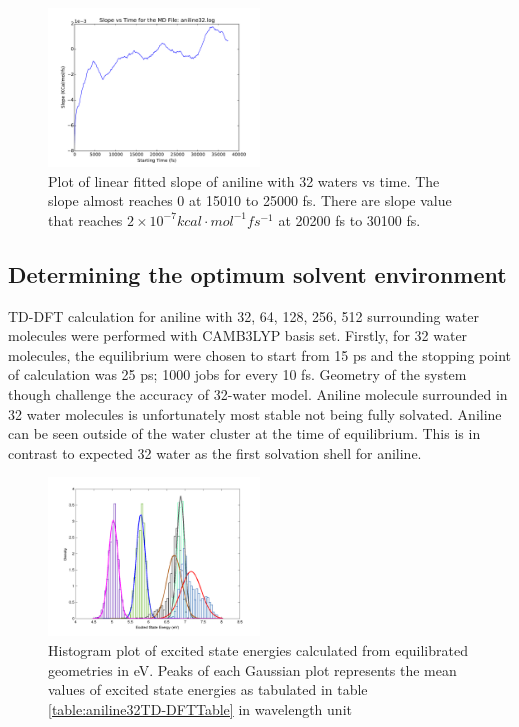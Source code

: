 \documentclass[
journal=jpcbfk, %
manuscript=article]{achemso}
\begin{document}
\begin{figure}[!htb]
	\centering		
	\includegraphics[width=0.5\textwidth]{CAMB3LYP/aniline32_log_SlopePlot.pdf}
	\caption{Plot of linear fitted slope of aniline with 32 waters vs time. The slope almost reaches 0 at 15010 to 25000 fs. There are slope value that reaches \(2\times 10^{-7} kcal\cdot mol^{-1}fs^{-1}\) at 20200 fs to 30100 fs.}
	\label{fig:aniline32SlopePlot}
\end{figure}


\subsection{Determining the optimum solvent environment}
TD-DFT calculation for aniline with 32, 64, 128, 256, 512 surrounding water molecules were performed with CAMB3LYP basis set. Firstly, for 32 water molecules, the equilibrium were chosen to start from 15 ps and the stopping point of calculation was 25 ps; 1000 jobs for every 10 fs.  Geometry of the system though challenge the accuracy of 32-water model. Aniline molecule surrounded in 32 water molecules is unfortunately most stable not being fully solvated. Aniline can be seen outside of the water cluster at the time of equilibrium. This is in contrast to expected 32 water as the first solvation shell for aniline. \cite{Plugatyr2009} 

\begin{figure}[!htb]
	\centering		
	\includegraphics[width=0.5\textwidth]{CAMB3LYP/aniline32SPlot.png}
	\caption{Histogram plot of excited state energies calculated from equilibrated geometries in eV. Peaks of each Gaussian plot represents the mean values of excited state energies as tabulated in table \ref{table:aniline32TD-DFTTable} in wavelength unit}
	\label{fig:aniline32SPlot}
\end{figure}
\end{document}
